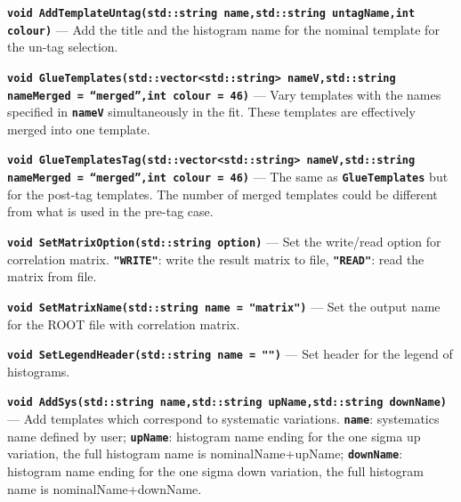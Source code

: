 \documentclass[12pt]{article}
\newcommand\verbbf[1]{\textcolor[rgb]{0,0,1}{\texttt{\textbf{#1}}}}
\newcommand\verbbfb[1]{\textcolor[rgb]{0,0,0}{\texttt{\textbf{#1}}}}
\begin{document}
\vspace{0.3cm}

\noindent \verbbf{void AddTemplateUntag(std::string name,std::string
untagName,int colour)} ---
Add the title and the histogram name for the nominal template for the
un-tag selection.

\vspace{0.3cm}

\noindent \verbbf{void GlueTemplates(std::vector<std::string>
nameV,std::string nameMerged = ``merged'',int colour = 46)} ---
Vary templates with the names specified in \verbbfb{nameV}
simultaneously in the fit. These templates are effectively merged into
one template.

\vspace{0.3cm}

\noindent \verbbf{void GlueTemplatesTag(std::vector<std::string>
nameV,std::string nameMerged = ``merged'',int colour = 46)} ---
The same as \verbbf{GlueTemplates} but for the post-tag templates. The
number of merged templates could be different from what is used in
the pre-tag case.

\vspace{0.3cm}

\noindent \verbbf{void SetMatrixOption(std::string option)} ---
Set the write/read option for correlation matrix. \verbbf{"WRITE"}:
write the result matrix to file, \verbbf{"READ"}: read the matrix from
file.

\vspace{0.3cm}

\noindent \verbbf{void SetMatrixName(std::string name = "matrix")} ---
Set the output name for the ROOT file with correlation matrix.

\vspace{0.3cm}

\noindent \verbbf{void SetLegendHeader(std::string name = "")} ---
Set header for the legend of histograms.

\vspace{0.3cm}

\noindent \verbbf{void AddSys(std::string name,std::string upName,std::string downName)} ---
Add templates which correspond to systematic variations.
\verbbfb{name}: systematics name defined by user;
\verbbfb{upName}: histogram name ending for the one sigma up variation, the full
histogram name is nominalName+upName;
\verbbfb{downName}: histogram name ending for
the one sigma down variation, the full histogram name is
nominalName+downName.

\vspace{0.3cm} 
\end{document}
